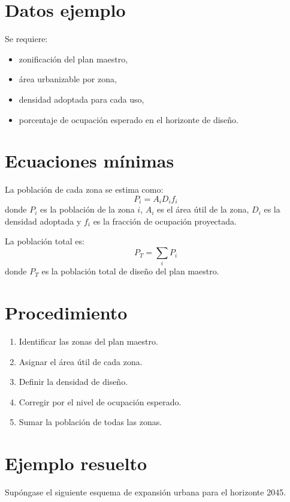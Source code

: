 \documentclass[12pt]{article}
\begin{document}

\section{Datos ejemplo}
Se requiere:
\begin{itemize}
\item zonificación del plan maestro,
\item área urbanizable por zona,
\item densidad adoptada para cada uso,
\item porcentaje de ocupación esperado en el horizonte de diseño.
\end{itemize}

\section{Ecuaciones mínimas}
La población de cada zona se estima como:
\begin{equation}
P_i=A_iD_if_i
\end{equation}
donde $P_i$ es la población de la zona $i$, $A_i$ es el área útil de la zona, $D_i$ es la densidad adoptada y $f_i$ es la fracción de ocupación proyectada.

La población total es:
\begin{equation}
P_T=\sum_i P_i
\end{equation}
donde $P_T$ es la población total de diseño del plan maestro.

\section{Procedimiento}
\begin{enumerate}
\item Identificar las zonas del plan maestro.
\item Asignar el área útil de cada zona.
\item Definir la densidad de diseño.
\item Corregir por el nivel de ocupación esperado.
\item Sumar la población de todas las zonas.
\end{enumerate}

\section{Ejemplo resuelto}
Supóngase el siguiente esquema de expansión urbana para el horizonte 2045.
\end{document}
